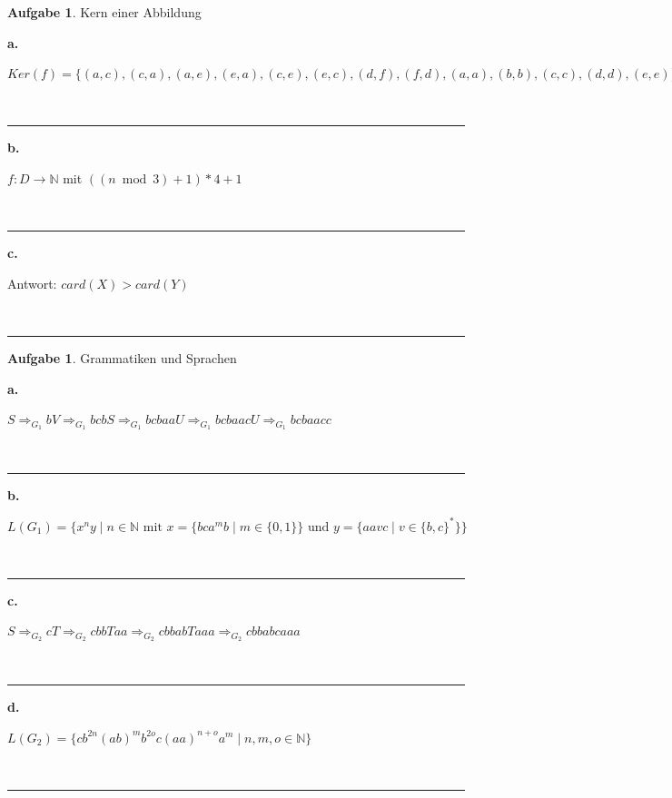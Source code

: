 \documentclass[10pt,leqno ]{article}
\theoremstyle{definition}
\newtheorem{problem}[theorem]{Aufgabe}
\newenvironment{solution}[1][L]{\begin{doublespace}\textbf{#1.}\quad }{\ \rule{0.5em}{0.5em}\end{doublespace}}
\begin{document}
\begin{problem}
    Kern einer Abbildung
\end{problem}
\begin{solution}[a]
    
\( Ker(f) = \{ (a,c), (c,a), (a,e), (e,a), (c,e), (e,c), (d,f), (f,d), (a,a), (b,b), (c,c), (d,d), (e,e) \} \)

\end{solution}

\begin{solution}[b]

    \( f:D \rightarrow \mathbb{N} \) mit \( ((n \bmod 3) + 1) * 4 + 1 \)

\end{solution}

\begin{solution}[c]

    Antwort: \( card(X) > card(Y) \)
    
\end{solution}

\begin{problem}
    Grammatiken und Sprachen
\end{problem}

\begin{solution}[a]

    \(S \Rightarrow_{G_1} bV \Rightarrow_{G_1} bcbS \Rightarrow_{G_1} bcbaaU \Rightarrow_{G_1} bcbaacU \Rightarrow_{G_1} bcbaacc \)

\end{solution}

\begin{solution}[b]

    \( L(G_1) = \{ x^{n}y \mid n \in \mathbb{N} \text{ mit } x = \{bca^{m}b \mid m \in \{0,1\}\} \text{ und } y = \{aavc \mid v \in \{b,c\}^{*}\} \} \)

\end{solution}

\begin{solution}[c]

    \(S \Rightarrow_{G_2} cT \Rightarrow_{G_2} cbbTaa \Rightarrow_{G_2} cbbabTaaa \Rightarrow_{G_2} cbbabcaaa \)
    
\end{solution}

\begin{solution}[d]

    \( L(G_2) = \{ cb^{2n}(ab)^{m}b^{2o}c(aa)^{n+o}a^{m} \mid n,m,o \in \mathbb{N} \} \)


    
\end{solution}
\end{document}
